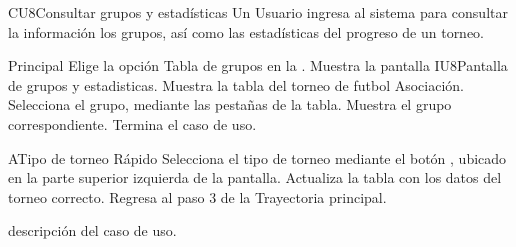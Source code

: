 \begin{UseCase}{CU8}{Consultar grupos y estadísticas}{
		Un Usuario ingresa al sistema 
para consultar la información los grupos, así como las 
estadísticas del progreso de un torneo.	}
		
	\end{UseCase}
	\newpage
	
	\begin{UCtrayectoria}{Principal}
	\UCpaso[\UCactor] Elige la opción Tabla de grupos en 
la .
	\UCpaso Muestra la pantalla {IU8}{Pantalla de grupos y estadisticas.}
	\UCpaso Muestra la tabla del torneo de futbol Asociación. 
	\UCpaso[\UCactor] Selecciona el grupo, mediante las pestañas de la tabla.
	\UCpaso Muestra el grupo correspondiente.
	\UCpaso Termina el caso de uso.
\end{UCtrayectoria}

\begin{UCtrayectoriaA}{A}{Tipo de torneo Rápido}
	\UCpaso[\UCactor] Selecciona el tipo de torneo mediante el botón , ubicado en la parte superior izquierda de la pantalla.
	\UCpaso Actualiza la tabla con los datos del torneo correcto.
	\UCpaso Regresa al paso 3 de la Trayectoria principal.
\end{UCtrayectoriaA}


descripción del caso de uso.

